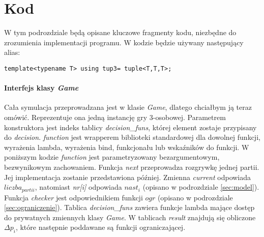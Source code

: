 \section{Kod}
\label{sec::kod}
W tym podrozdziale będą opisane kluczowe fragmenty kodu, niezbędne do zrozumienia implementacji programu. W kodzie będzie używany następujący alias:
\begin{lstlisting}
template<typename T> using tup3= tuple<T,T,T>;
\end{lstlisting}

\paragraph{Interfejs klasy \textit{Game}}
Cała symulacja przeprowadzana jest w klasie \textit{Game}, dlatego chciałbym ją teraz omówić. Reprezentuje ona jedną instancję gry 3-osobowej. Parametrem konstruktora jest indeks tablicy \textit{decision\_funs}, której element zostaje przypisany do \textit{decision}. \textit{function} jest wrapperem biblioteki standardowej dla dowolnej funkcji, wyrażenia lambda, wyrażenia bind, funkcjonału lub wskaźników do funkcji. W poniższym kodzie \textit{function} jest parametryzowany bezargumentowym, bezwynikowym zachowaniem. Funkcja \textit{next} przeprowadza rozgrywkę jednej partii. Jej implementacja zostanie przedstawiona później. Zmienna \textit{current} odpowiada $liczba_{partii}$, natomiast \textit{nr[i]} odpowiada $nast_i$ (opisano w podrozdziale \ref{sec:model}). Funkcja \textit{checker} jest odpowiednikiem funkcji $ogr$ (opisano w podrozdziale \ref{sec:ograniczenie}). Tablica \textit{decision\_funs} zawiera funkcje lambda mające dostęp do prywatnych zmiennych klasy \textit{Game}. W tablicach \textit{result} znajdują się obliczone $\Delta p_i$, które następnie poddawane są funkcji ograniczającej. 

